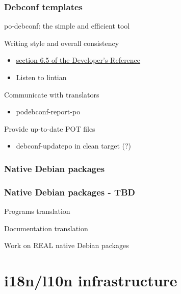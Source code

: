 \documentclass{beamer}
\begin{document}
\begin{frame}
  \frametitle{Debconf templates}
	\begin{block}
		{po-debconf: the simple and efficient tool}
	\end{block}
	\begin{block}
		{Writing style and overall consistency}
		\begin{itemize}
		\item
			\href{http://www.debian.org/doc/developers-reference/ch-best-pkging-practices.html\#s-bpp-config-mgmt}{section 6.5 of the Developer's Reference}
		\item
			Listen to lintian
		\end{itemize}
	\end{block}
	\begin{block}
		{Communicate with translators}
		\begin{itemize}
		\item
			podebconf-report-po
		\end{itemize}
	\end{block}
	\begin{block}
		{Provide up-to-date POT files}
		\begin{itemize}
		\item
			debconf-updatepo in clean target (?)
		\end{itemize}
	\end{block}
\end{frame}

\subsubsection{Native Debian packages}

\begin{frame}
  \frametitle{Native Debian packages - TBD}
	\begin{block}
		{Programs translation}
	\end{block}
	\begin{block}
		{Documentation translation}
	\end{block}
	\begin{block}
		{Work on REAL native Debian packages}
	\end{block}
\end{frame}



\section{i18n/l10n infrastructure}
\end{document}
